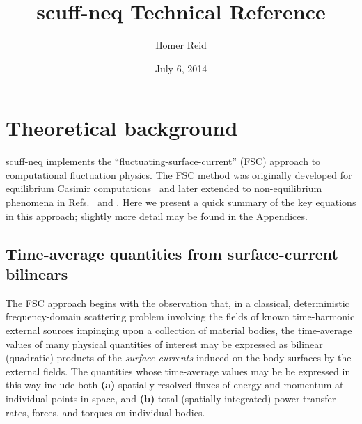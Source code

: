 \documentclass[letterpaper]{article}
\title {{\sc scuff-neq} Technical Reference}
\author {Homer Reid}
\date {July 6, 2014}
\begin{document}
\pagestyle{myheadings}
\maketitle

\tableofcontents

\newpage
\section{Theoretical background}

{\sc scuff-neq} implements the ``fluctuating-surface-current''
(FSC) approach to computational fluctuation physics. The 
FSC method was originally developed for equilibrium Casimir
computations~\cite{Reid2009, Reid2011, Reid2013B} and later
extended to non-equilibrium phenomena in 
Refs.~ and .
Here we present a quick summary of the key equations in this
approach; slightly more detail may be found in the Appendices.

\subsection{Time-average quantities from surface-current bilinears}
\label{PQsFromSCBsSection}

The FSC approach begins with the observation that, in a
classical, deterministic frequency-domain scattering problem 
involving the fields of known time-harmonic external sources 
impinging upon a collection of material bodies, the time-average
values of many physical quantities of interest may be expressed 
as bilinear (quadratic) products of the \textit{surface currents} 
induced on the body surfaces by
the external fields. The quantities whose time-average values
may be be expressed in this way include both \textbf{(a)} 
spatially-resolved fluxes of energy and momentum at individual 
points in space, and \textbf{(b)} total (spatially-integrated) 
power-transfer rates, forces, and torques on individual bodies.
\end{document}
